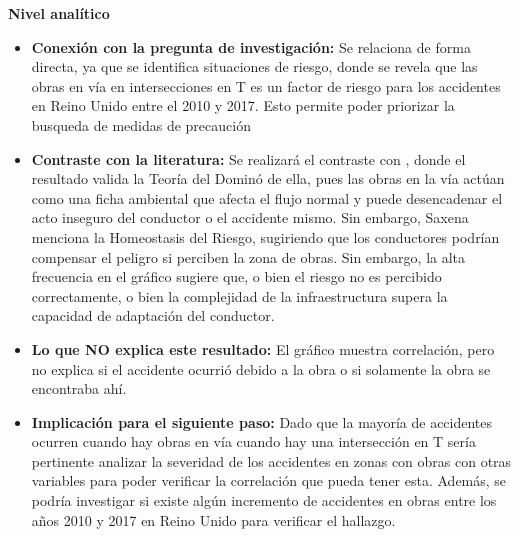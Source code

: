 \documentclass[12pt]{article}
\begin{document}
\textbf{Nivel analítico}
\begin{itemize}
    \item \textbf{Conexión con la pregunta de investigación:} Se relaciona de forma directa, 
    ya que se identifica situaciones de riesgo, donde se revela que las obras en vía en intersecciones en T 
    es un factor de riesgo para los accidentes en Reino Unido entre el 2010 y 2017. Esto 
    permite poder priorizar la busqueda de medidas de precaución 

    \item \textbf{Contraste con la literatura:} Se realizará el contraste con \textcite{SAXENA2017}, donde el resultado valida la Teoría del Dominó 
    de ella, pues las obras en la vía actúan como una ficha ambiental que afecta el flujo normal 
    y puede desencadenar el acto inseguro del conductor o el accidente mismo. Sin embargo, Saxena 
    menciona la Homeostasis del Riesgo, sugiriendo que los conductores podrían compensar el peligro 
    si perciben la zona de obras. Sin embargo, la alta frecuencia en el gráfico sugiere que, o bien el riesgo no es 
    percibido correctamente, o bien la complejidad de la infraestructura supera la capacidad de adaptación del conductor.

    \item \textbf{Lo que NO explica este resultado:} El gráfico muestra correlación, pero no explica si el accidente ocurrió debido a la obra 
    o si solamente la obra se encontraba ahí.

    \item \textbf{Implicación para el siguiente paso:} Dado que la mayoría de accidentes ocurren cuando hay obras en vía cuando hay una intersección en T 
    sería pertinente analizar la severidad de los accidentes en zonas con obras con otras variables para poder verificar la correlación que pueda tener esta.
    Además, se podría investigar si existe algún incremento de accidentes en obras entre los años 2010 y 2017 en Reino Unido para verificar 
    el hallazgo.
\end{itemize}
\end{document}
